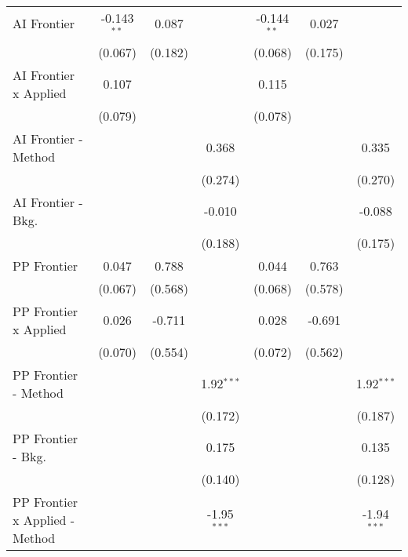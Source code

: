 \begin{tabular}{lcccccc}
   AI Frontier                    & -0.143$^{**}$  & 0.087   &               & -0.144$^{**}$  & 0.027   &   \\   
                                  & (0.067)        & (0.182) &               & (0.068)        & (0.175) &   \\   
   AI Frontier x Applied          & 0.107          &         &               & 0.115          &         &   \\   
                                  & (0.079)        &         &               & (0.078)        &         &   \\   
   AI Frontier - Method           &                &         & 0.368         &                &         & 0.335\\   
                                  &                &         & (0.274)       &                &         & (0.270)\\   
   AI Frontier - Bkg.             &                &         & -0.010        &                &         & -0.088\\   
                                  &                &         & (0.188)       &                &         & (0.175)\\   
   PP Frontier                    & 0.047          & 0.788   &               & 0.044          & 0.763   &   \\   
                                  & (0.067)        & (0.568) &               & (0.068)        & (0.578) &   \\   
   PP Frontier x Applied          & 0.026          & -0.711  &               & 0.028          & -0.691  &   \\   
                                  & (0.070)        & (0.554) &               & (0.072)        & (0.562) &   \\   
   PP Frontier - Method           &                &         & 1.92$^{***}$  &                &         & 1.92$^{***}$\\   
                                  &                &         & (0.172)       &                &         & (0.187)\\   
   PP Frontier - Bkg.             &                &         & 0.175         &                &         & 0.135\\   
                                  &                &         & (0.140)       &                &         & (0.128)\\   
   PP Frontier x Applied - Method &                &         & -1.95$^{***}$ &                &         & -1.94$^{***}$\\   

\end{tabular}
